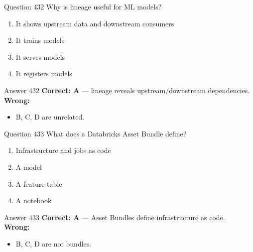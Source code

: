 \documentclass[aspectratio=169,11pt]{beamer}
\begin{document}
	\begin{frame}{Question 432}
		Why is lineage useful for ML models?
		\begin{enumerate}[label=\Alph*.]
			\item It shows upstream data and downstream consumers
			\item It trains models
			\item It serves models
			\item It registers models
		\end{enumerate}
	\end{frame}
	\begin{frame}{Answer 432}
		\textbf{Correct: A} --- lineage reveals upstream/downstream dependencies.\\
		\vspace{0.5em}
		\textbf{Wrong:}
		\begin{itemize}
			\item B, C, D are unrelated.
		\end{itemize}
	\end{frame}
	
	\begin{frame}{Question 433}
		What does a Databricks Asset Bundle define?
		\begin{enumerate}[label=\Alph*.]
			\item Infrastructure and jobs as code
			\item A model
			\item A feature table
			\item A notebook
		\end{enumerate}
	\end{frame}
	\begin{frame}{Answer 433}
		\textbf{Correct: A} --- Asset Bundles define infrastructure as code.\\
		\vspace{0.5em}
		\textbf{Wrong:}
		\begin{itemize}
			\item B, C, D are not bundles.
		\end{itemize}
	\end{frame}
	
\end{document}
